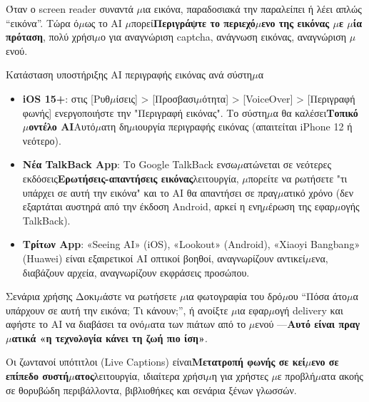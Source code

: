 
Όταν ο screen reader συναντά $\mu$ια εικόνα, παραδοσιακά την παραλείπει ή λέει απλώς “εικόνα”. Τώρα ό$\mu$ως το AI $\mu$πορεί\textbf{Περιγράψτε το περιεχό$\mu$ενο της εικόνας $\mu$ε $\mu$ία πρόταση}, πολύ χρήσι$\mu$ο για αναγνώριση captcha, ανάγνωση εικόνας, αναγνώριση $\mu$ενού.

\begin{tcbinfo}{Κατάσταση υποστήριξης AI περιγραφής εικόνας ανά σύστη$\mu$α}
\begin{itemize}
  \item \textbf{iOS 15+}: στις [Ρυθ$\mu$ίσεις] > [Προσβασι$\mu$ότητα] > [VoiceOver] > [Περιγραφή φωνής] ενεργοποιήστε την "Περιγραφή εικόνας". Το σύστη$\mu$α θα καλέσει\textbf{Τοπικό $\mu$οντέλο AI}Αυτό$\mu$ατη δη$\mu$ιουργία περιγραφής εικόνας (απαιτείται iPhone 12 ή νεότερο).
  \item \textbf{Νέα TalkBack App}: Το Google TalkBack ενσω$\mu$ατώνεται σε νεότερες εκδόσεις\textbf{Ερωτήσεις-απαντήσεις εικόνας}λειτουργία, $\mu$πορείτε να ρωτήσετε "τι υπάρχει σε αυτή την εικόνα" και το AI θα απαντήσει σε πραγ$\mu$ατικό χρόνο (δεν εξαρτάται αυστηρά από την έκδοση Android, αρκεί η ενη$\mu$έρωση της εφαρ$\mu$ογής TalkBack).
  \item \textbf{Τρίτων App}: «Seeing AI» (iOS), «Lookout» (Android), «Xiaoyi Bangbang» (Huawei) είναι εξαιρετικοί AI οπτικοί βοηθοί, αναγνωρίζουν αντικεί$\mu$ενα, διαβάζουν αρχεία, αναγνωρίζουν εκφράσεις προσώπου.
\end{itemize}

\end{tcbinfo}

\begin{tcbpractice}{Σενάρια χρήσης}
Δοκι$\mu$άστε να ρωτήσετε $\mu$ια φωτογραφία του δρό$\mu$ου “Πόσα άτο$\mu$α υπάρχουν σε αυτή την εικόνα; Τι κάνουν;”, ή ανοίξτε $\mu$ια εφαρ$\mu$ογή delivery και αφήστε το AI να διαβάσει τα ονό$\mu$ατα των πιάτων από το $\mu$ενού —\textbf{Αυτό είναι πραγ$\mu$ατικά «η τεχνολογία κάνει τη ζωή πιο ίση»}.

\end{tcbpractice}


Οι ζωντανοί υπότιτλοι (Live Captions) είναι\textbf{Μετατροπή φωνής σε κεί$\mu$ενο σε επίπεδο συστή$\mu$ατος}λειτουργία, ιδιαίτερα χρήσι$\mu$η για χρήστες $\mu$ε προβλή$\mu$ατα ακοής σε θορυβώδη περιβάλλοντα, βιβλιοθήκες και σενάρια ξένων γλωσσών.

